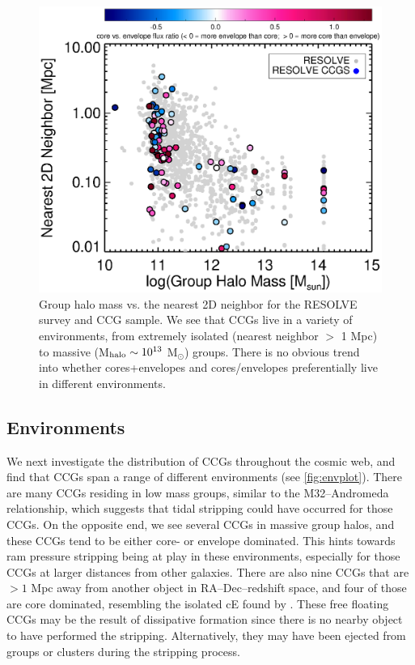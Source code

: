 \documentclass[iop,apj]{emulateapj}
\begin{document}
\begin{figure}[hbpt!]
\begin{center}
\includegraphics{nn_groupmass_2d.eps}
\caption{Group halo mass vs. the nearest 2D neighbor for the RESOLVE survey and CCG sample. We see that CCGs live in a variety of environments, from extremely isolated (nearest neighbor $>$ 1 Mpc) to massive (M$_{\rm halo} \sim 10^{13}$ M$_{\odot}$) groups. There is no obvious trend into whether cores+envelopes and cores/envelopes preferentially live in different environments.}
\label{fig:envplot}
\end{center}
\end{figure}

\subsection{Environments}
We next investigate the distribution of CCGs throughout the cosmic web, and find that CCGs span a range of different environments (see \autoref{fig:envplot}). There are many CCGs residing in low mass groups, similar to the M32--Andromeda relationship, which suggests that tidal stripping could have occurred for those CCGs. On the opposite end, we see several CCGs in massive group halos, and these CCGs tend to be either core- or envelope dominated. This hints towards ram pressure stripping being at play in these environments, especially for those CCGs at larger distances from other galaxies. There are also nine CCGs that are $>1$ Mpc away from another object in RA--Dec--redshift space, and four of those are core dominated, resembling the isolated cE found by \citet{Huxor2013}. These free floating CCGs may be the result of dissipative formation since there is no nearby object to have performed the stripping. Alternatively, they may have been ejected from groups or clusters during the stripping process.
 
\end{document}
